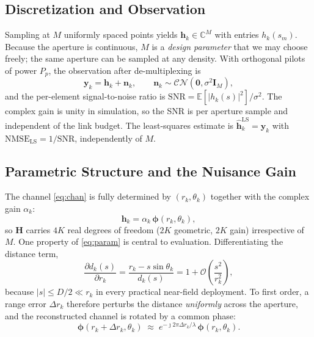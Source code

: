 \documentclass[journal]{IEEEtran}
\begin{document}
\subsection{Discretization and Observation}

Sampling at $M$ uniformly spaced points yields $\mathbf{h}_k \in \mathbb{C}^{M}$ with entries $h_k(s_m)$. Because the aperture is continuous, $M$ is a \emph{design parameter} that we may choose freely; the same aperture can be sampled at any density. With orthogonal pilots of power $P_p$, the observation after de-multiplexing is
\begin{equation}
\mathbf{y}_k = \mathbf{h}_k + \mathbf{n}_k, \qquad \mathbf{n}_k \sim \mathcal{CN}\!\left(\mathbf{0}, \sigma^{2} \mathbf{I}_M\right),
\label{eq:obs}
\end{equation}
and the per-element signal-to-noise ratio is $\mathrm{SNR} = \mathbb{E}[|h_k(s)|^{2}]/\sigma^{2}$. The complex gain is unity in simulation, so the SNR is per aperture sample and independent of the link budget. The least-squares estimate is $\widehat{\mathbf{h}}_k^{\mathrm{LS}} = \mathbf{y}_k$ with $\mathrm{NMSE}_{\mathrm{LS}} = 1/\mathrm{SNR}$, independently of $M$.

\subsection{Parametric Structure and the Nuisance Gain}

The channel \eqref{eq:chan} is fully determined by $(r_k, \theta_k)$ together with the complex gain $\alpha_k$:
\begin{equation}
\mathbf{h}_k = \alpha_k\, \bm{\phi}\!\left(r_k, \theta_k\right),
\label{eq:param}
\end{equation}
so $\mathbf{H}$ carries $4K$ real degrees of freedom ($2K$ geometric, $2K$ gain) irrespective of $M$. One property of \eqref{eq:param} is central to evaluation. Differentiating the distance term,
\begin{equation}
\frac{\partial d_k(s)}{\partial r_k} = \frac{r_k - s\sin\theta_k}{d_k(s)} = 1 + \mathcal{O}\!\left(\frac{s^{2}}{r_k^{2}}\right),
\label{eq:deriv}
\end{equation}
because $|s| \leq D/2 \ll r_k$ in every practical near-field deployment. To first order, a range error $\Delta r_k$ therefore perturbs the distance \emph{uniformly} across the aperture, and the reconstructed channel is rotated by a common phase:
\begin{equation}
\bm{\phi}(r_k + \Delta r_k, \theta_k) \;\approx\; e^{-\jmath 2\pi \Delta r_k/\lambda}\, \bm{\phi}(r_k, \theta_k).
\label{eq:commonphase}
\end{equation}
\end{document}
